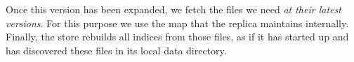 Once this version has been expanded, we fetch the files we need \textit{at their latest versions}. For this purpose we use the map that the replica maintains internally. Finally, the store rebuilds all indices from those files, as if it has started up and has discovered these files in its local data directory.

